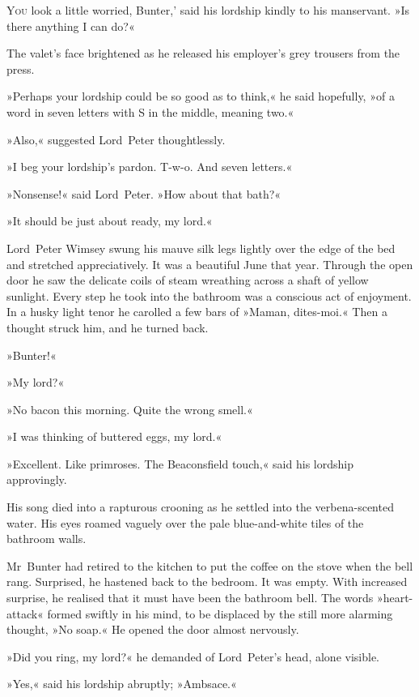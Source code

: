 
\lettrine[lines=4,ante=‘]{Y}{ou} look a little worried, Bunter,' said his lordship kindly to his manservant. »Is there anything I can do?«

\zz
The valet's face brightened as he released his employer's grey trousers from the press.

»Perhaps your lordship could be so good as to think,« he said hopefully, »of a word in seven letters with S in the middle, meaning two.«

»Also,« suggested Lord~Peter thoughtlessly.

»I beg your lordship's pardon. T-w-o. And seven letters.«

»Nonsense!« said Lord~Peter. »How about that bath?«

»It should be just about ready, my lord.«

Lord~Peter Wimsey swung his mauve silk legs lightly over the edge of the bed and stretched appreciatively. It was a beautiful June that year. Through the open door he saw the delicate coils of steam wreathing across a shaft of yellow sunlight. Every step he took into the bathroom was a conscious act of enjoyment. In a husky light tenor he carolled a few bars of »Maman, dites-moi.« Then a thought struck him, and he turned back.

»Bunter!«

»My lord?«

»No bacon this morning. Quite the wrong smell.«

»I was thinking of buttered eggs, my lord.«

»Excellent. Like primroses. The Beaconsfield touch,« said his lordship approvingly.

His song died into a rapturous crooning as he settled into the verbena-scented water. His eyes roamed vaguely over the pale blue-and-white tiles of the bathroom walls.

Mr~Bunter had retired to the kitchen to put the coffee on the stove when the bell rang. Surprised, he hastened back to the bedroom. It was empty. With increased surprise, he realised that it must have been the bathroom bell. The words »heart-attack« formed swiftly in his mind, to be displaced by the still more alarming thought, »No soap.« He opened the door almost nervously.

»Did you ring, my lord?« he demanded of Lord~Peter's head, alone visible.

»Yes,« said his lordship abruptly; »Ambsace.«

